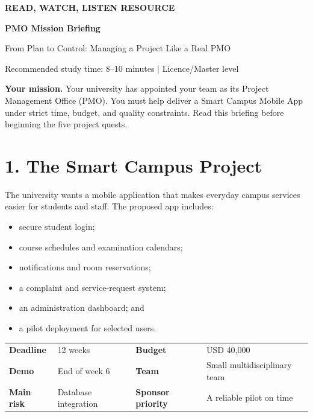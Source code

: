 \documentclass[11pt,a4paper]{article}
\begin{document}
\begin{center}
  {\small\bfseries\color{pmoTeal} READ, WATCH, LISTEN RESOURCE}\par
  \vspace{3mm}
  {\Huge\bfseries\color{pmoDark} PMO Mission Briefing}\par
  \vspace{2mm}
  {\Large From Plan to Control: Managing a Project Like a Real PMO}\par
  \vspace{3mm}
  {\small Recommended study time: 8--10 minutes \quad | \quad Licence/Master level}
\end{center}

\begin{missionbox}
\textbf{Your mission.} Your university has appointed your team as its Project Management Office (PMO). You must help deliver a Smart Campus Mobile App under strict time, budget, and quality constraints. Read this briefing before beginning the five project quests.
\end{missionbox}

\section{1. The Smart Campus Project}

The university wants a mobile application that makes everyday campus services easier for students and staff. The proposed app includes:

\begin{itemize}
  \item secure student login;
  \item course schedules and examination calendars;
  \item notifications and room reservations;
  \item a complaint and service-request system;
  \item an administration dashboard; and
  \item a pilot deployment for selected users.
\end{itemize}

\begin{center}
\begin{tabularx}{0.94\textwidth}{>{\bfseries}l X >{\bfseries}l X}
\toprule
Deadline & 12 weeks & Budget & USD 40,000 \\
Demo & End of week 6 & Team & Small multidisciplinary team \\
Main risk & Database integration & Sponsor priority & A reliable pilot on time \\
\bottomrule
\end{tabularx}
\end{center}
\end{document}

